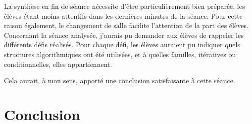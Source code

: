 \documentclass[pdftex,a4paper,12pt]{article}
\begin{document}
	La synthèse en fin de séance nécessite d'être particulièrement bien préparée, 
	les élèves étant moins attentifs dans les dernières minutes de la séance.
	Pour cette raison également, le changement de salle facilite l'attention de la part des élèves.\\

	Concernant la séance analysée, j'aurais pu demander aux élèves de rappeler les différents défis réalisés.
	Pour chaque défi, les élèves auraient pu indiquer quels structures algorithmiques ont été utilisées, et à quelles familles, 
	itératives ou conditionnelles, elles appartiennent.

	Cela aurait, à mon sens, apporté une conclusion satisfaisante à cette séance.

	\section{Conclusion}

\end{document}
